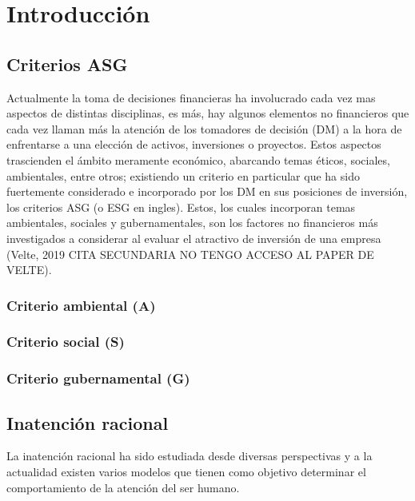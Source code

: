 \documentclass[11pt,letterpaper]{article}
\begin{document}

\tableofcontents
\newpage


\section{Introducción}

\subsection{Criterios ASG}

 Actualmente la toma de decisiones financieras ha involucrado cada vez mas aspectos de distintas disciplinas, es más, hay algunos elementos no financieros que cada vez llaman más la atención de los tomadores de decisión (DM) a la hora de enfrentarse a una elección de activos, inversiones o proyectos. Estos aspectos trascienden el ámbito meramente económico, abarcando temas éticos, sociales, ambientales, entre otros; existiendo un criterio en particular que ha sido fuertemente considerado e incorporado por los DM en sus posiciones de inversión, los criterios ASG (o ESG en ingles). Estos, los cuales incorporan temas ambientales, sociales y gubernamentales, son los factores no financieros más investigados a considerar al evaluar el atractivo de inversión de una empresa (Velte, 2019 CITA SECUNDARIA NO TENGO ACCESO AL PAPER DE VELTE).

 \subsubsection{Criterio ambiental (A)}

 \subsubsection{Criterio social (S)}

 \subsubsection{Criterio gubernamental (G)}

\subsection{Inatención racional}

La inatención racional ha sido estudiada desde diversas perspectivas y a la actualidad existen varios modelos que tienen como objetivo determinar el comportamiento de la atención del ser humano.
\end{document}
